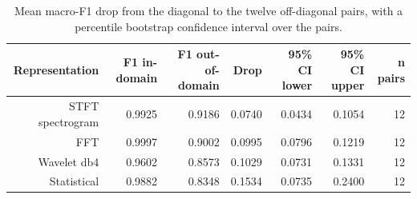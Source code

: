 \begin{table}[htbp]
\centering
\caption{Mean macro-F1 drop from the diagonal to the twelve off-diagonal pairs, with a percentile bootstrap confidence interval over the pairs.}
\label{tab:caidas}
\begin{tabular}{rrrrrrr}
\toprule
Representation & F1 in-domain & F1 out-of-domain & Drop & 95\% CI lower & 95\% CI upper & n pairs \\
\midrule
STFT spectrogram & 0.9925 & 0.9186 & 0.0740 & 0.0434 & 0.1054 & 12 \\
FFT & 0.9997 & 0.9002 & 0.0995 & 0.0796 & 0.1219 & 12 \\
Wavelet db4 & 0.9602 & 0.8573 & 0.1029 & 0.0731 & 0.1331 & 12 \\
Statistical & 0.9882 & 0.8348 & 0.1534 & 0.0735 & 0.2400 & 12 \\
\bottomrule
\end{tabular}
\end{table}
